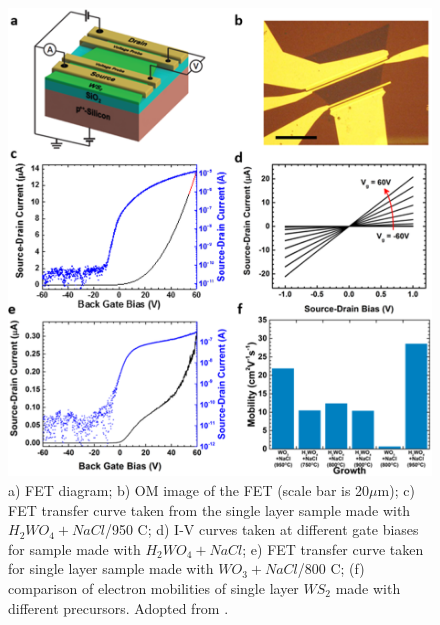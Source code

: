 \begin{figure}[h]
	\begin{center}
		\includegraphics[scale=0.3]{PaperElectricalMeasurementMonolayer.png}
		\caption{a) FET diagram; b) OM image of the FET (scale bar is 20${\mu}$m); c) FET transfer curve taken from the single layer sample made with $H_2WO_4+NaCl$/950 {\degree}C; d) I-V curves taken at different gate biases for sample made with $H_2WO_4+NaCl$; e) FET transfer curve taken for single layer sample made with $WO_3+NaCl$/800 {\degree}C; (f) comparison of electron mobilities of single layer $WS_2$ made with different precursors. Adopted from \cite{Reale2017}.}
		\label{fig:PaperElectricalMeasurementMonolayer}
	\end{center}
\end{figure}


